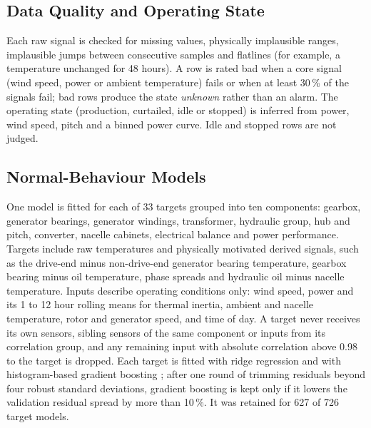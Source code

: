 \documentclass[conference]{IEEEtran}
\begin{document}
\subsection{Data Quality and Operating State}
Each raw signal is checked for missing values, physically implausible ranges, implausible jumps between consecutive samples and flatlines (for example, a temperature unchanged for 48 hours). A row is rated bad when a core signal (wind speed, power or ambient temperature) fails or when at least 30\,\% of the signals fail; bad rows produce the state \emph{unknown} rather than an alarm. The operating state (production, curtailed, idle or stopped) is inferred from power, wind speed, pitch and a binned power curve. Idle and stopped rows are not judged.

\subsection{Normal-Behaviour Models}
One model is fitted for each of 33 targets grouped into ten components: gearbox, generator bearings, generator windings, transformer, hydraulic group, hub and pitch, converter, nacelle cabinets, electrical balance and power performance. Targets include raw temperatures and physically motivated derived signals, such as the drive-end minus non-drive-end generator bearing temperature, gearbox bearing minus oil temperature, phase spreads and hydraulic oil minus nacelle temperature. Inputs describe operating conditions only: wind speed, power and its 1 to 12 hour rolling means for thermal inertia, ambient and nacelle temperature, rotor and generator speed, and time of day. A target never receives its own sensors, sibling sensors of the same component or inputs from its correlation group, and any remaining input with absolute correlation above 0.98 to the target is dropped. Each target is fitted with ridge regression and with histogram-based gradient boosting \cite{friedman2001gbm}; after one round of trimming residuals beyond four robust standard deviations, gradient boosting is kept only if it lowers the validation residual spread by more than 10\,\%. It was retained for 627 of 726 target models.
\end{document}
